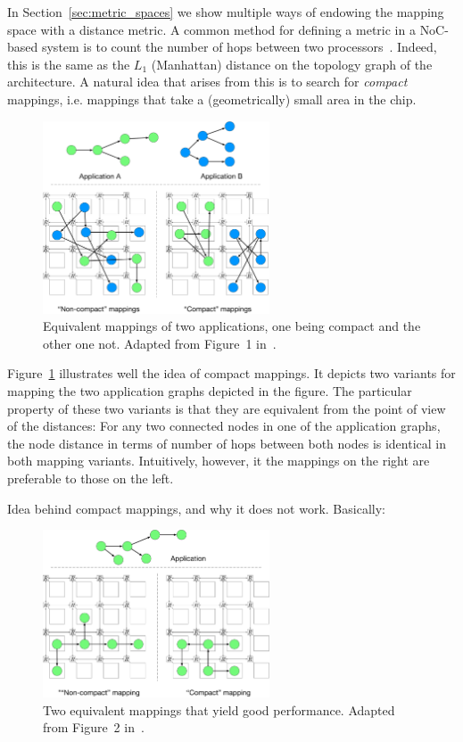 In Section~\ref{sec:metric_spaces} we show multiple ways of endowing the mapping space with a distance metric.
A common method for defining a metric in a \ac{NoC}-based system is to count the number of hops between two processors~\cite{singh2010communication,schwarzer2017symmetry}.
Indeed, this is the same as the $L_1$ (Manhattan) distance on the topology graph of the architecture.
A natural idea that arises from this is to search for \emph{compact} mappings, i.e. mappings that take a (geometrically) small area in the chip.


\begin{figure}[th]
	\centering
	\includegraphics[width=0.6\textwidth]{figures/compact_intro.pdf}
	\caption{Equivalent mappings of two applications, one being compact and the other one not. Adapted from Figure~1 in~\cite{goens_samos19}.}
	\label{fig:compact_intro}
\end{figure}

Figure~\ref{fig:compact_intro} illustrates well the idea of compact mappings.
It depicts two variants for mapping the two application graphs depicted in the figure.
The particular property of these two variants is that they are equivalent from the point of view of the distances:
For any two connected nodes in one of the application graphs, the node distance in terms of number of hops between both nodes is identical in both mapping variants.
Intuitively, however, it the mappings on the right are preferable to those on the left. 

Idea behind compact mappings, and why it does not work. Basically:\cite{goens_samos19}

\begin{figure}[th]
	\centering
	\includegraphics[width=0.6\textwidth]{figures/topology_vs_geometry.pdf}
	\caption{Two equivalent mappings that yield good performance. Adapted from Figure~2 in~\cite{goens_samos19}.}
	\label{fig:topology_vs_geometry}
\end{figure}



